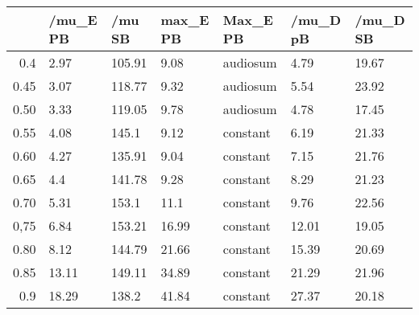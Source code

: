 \begin{table}[ht]
\centering
\begin{tabular}{rllllll}
  \hline
 & /mu\_E PB & /mu SB & max\_E PB & Max\_E PB & /mu\_D pB & /mu\_D SB \\ 
  \hline
0.4 & 2.97 & 105.91 & 9.08 & audiosum & 4.79 & 19.67 \\ 
  0.45 & 3.07 & 118.77 & 9.32 & audiosum & 5.54 & 23.92 \\ 
  0.50 & 3.33 & 119.05 & 9.78 & audiosum & 4.78 & 17.45 \\ 
  0.55 & 4.08 & 145.1 & 9.12 & constant & 6.19 & 21.33 \\ 
  0.60 & 4.27 & 135.91 & 9.04 & constant & 7.15 & 21.76 \\ 
  0.65 & 4.4 & 141.78 & 9.28 & constant & 8.29 & 21.23 \\ 
  0.70 & 5.31 & 153.1 & 11.1 & constant & 9.76 & 22.56 \\ 
  0,75 & 6.84 & 153.21 & 16.99 & constant & 12.01 & 19.05 \\ 
  0.80 & 8.12 & 144.79 & 21.66 & constant & 15.39 & 20.69 \\ 
  0.85 & 13.11 & 149.11 & 34.89 & constant & 21.29 & 21.96 \\ 
  0.9 & 18.29 & 138.2 & 41.84 & constant & 27.37 & 20.18 \\ 
   \hline
\end{tabular}
\end{table}
